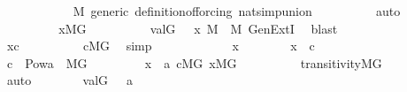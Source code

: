 \begin{isabellebody}
\ \ \ \ \ \ \ \ \isamarkupfalse%
\ {\isacartoucheopen}{\isasymchi}\ {\isasymin}\ M{\isacartoucheclose}\ generic\ definition{\isacharunderscore}{\kern0pt}of{\isacharunderscore}{\kern0pt}forcing\ nat{\isacharunderscore}{\kern0pt}simp{\isacharunderscore}{\kern0pt}union\isanewline
\ \ \ \ \ \ \ \ \isamarkupfalse%
\ auto\isanewline
\ \ \ \ \ \ \isamarkupfalse%
\ \isanewline
\ \ \ \ \ \ \isamarkupfalse%
\ {\isachardoublequoteopen}x{\isasymin}M{\isacharbrackleft}{\kern0pt}G{\isacharbrackright}{\kern0pt}{\isachardoublequoteclose}\isanewline
\ \ \ \ \ \ \ \ \isamarkupfalse%
\ {\isacartoucheopen}val{\isacharparenleft}{\kern0pt}G{\isacharcomma}{\kern0pt}{\isasymsigma}{\isacharparenright}{\kern0pt}\ {\isacharequal}{\kern0pt}\ \ x{\isacartoucheclose}\ {\isacartoucheopen}{\isasymsigma}{\isasymin}M{\isacartoucheclose}\ \ {\isacartoucheopen}{\isasymchi}{\isasymin}M{\isacartoucheclose}\ GenExtI\ \isamarkupfalse%
\ blast\isanewline
\ \ \ \ \ \ \isamarkupfalse%
\ \isanewline
\ \ \ \ \ \ \isamarkupfalse%
\ {\isachardoublequoteopen}x{\isasymin}c{\isachardoublequoteclose}\isanewline
\ \ \ \ \ \ \ \ \isamarkupfalse%
\ {\isacartoucheopen}c{\isasymin}M{\isacharbrackleft}{\kern0pt}G{\isacharbrackright}{\kern0pt}{\isacartoucheclose}\ \isamarkupfalse%
\ simp\isanewline
\ \ \ \ \isamarkupfalse%
\isanewline
\ \ \ \ \ \ \isamarkupfalse%
\ x\isanewline
\ \ \ \ \ \ \isamarkupfalse%
\ {\isachardoublequoteopen}x\ {\isasymin}\ c{\isachardoublequoteclose}\isanewline
\ \ \ \ \ \ \isamarkupfalse%
\ {\isacartoucheopen}c\ {\isasymin}\ Pow{\isacharparenleft}{\kern0pt}a{\isacharparenright}{\kern0pt}\ {\isasyminter}\ M{\isacharbrackleft}{\kern0pt}G{\isacharbrackright}{\kern0pt}{\isacartoucheclose}\ \isanewline
\ \ \ \ \ \ \isamarkupfalse%
\ {\isachardoublequoteopen}x\ {\isasymin}\ a{\isachardoublequoteclose}\ {\isachardoublequoteopen}c{\isasymin}M{\isacharbrackleft}{\kern0pt}G{\isacharbrackright}{\kern0pt}{\isachardoublequoteclose}\ {\isachardoublequoteopen}x{\isasymin}M{\isacharbrackleft}{\kern0pt}G{\isacharbrackright}{\kern0pt}{\isachardoublequoteclose}\isanewline
\ \ \ \ \ \ \ \ \isamarkupfalse%
\ transitivity{\isacharunderscore}{\kern0pt}MG\isanewline
\ \ \ \ \ \ \ \ \isamarkupfalse%
\ auto\isanewline
\ \ \ \ \ \ \isamarkupfalse%
\ {\isacartoucheopen}val{\isacharparenleft}{\kern0pt}G{\isacharcomma}{\kern0pt}\ {\isasymtau}{\isacharparenright}{\kern0pt}\ {\isacharequal}{\kern0pt}\ a{\isacartoucheclose}\ \isanewline

\end{isabellebody}
